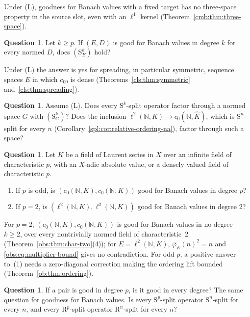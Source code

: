 \documentclass[11pt]{amsart}
\theoremstyle{definition}
\theoremstyle{remark}
\numberwithin{equation}{section}
\newcommand{\N}{\mathbb N}
\newcommand{\Kh}{\widehat K}
\theoremstyle{plain}
\theoremstyle{definition}
\newtheorem{question}[theorem]{Question}
\theoremstyle{plain}
\begin{document}
Under \textup{(L)}, goodness for Banach values with a fixed target has no three-space property in the source slot, even
with an $\ell^1$ kernel (Theorem~\ref{cmb:thm:three-space}).

\begin{question}\label{q:quest:source-split}
Let $k\ge p$. If $(E,D)$ is good for Banach values in degree $k$ for every normed $D$, does $(\mathrm S^k_E)$ hold?
\end{question}

Under \textup{(L)} the answer is yes for spreading, in particular symmetric, sequence spaces $E$ in which $c_{00}$ is
dense (Theorems~\ref{cls:thm:symmetric} and~\ref{cls:thm:spreading}).

\begin{question}\label{q:quest:factorization}
Assume \textup{(L)}. Does every $\mathrm S^k$-split operator factor through a normed space $G$ with $(\mathrm S^k_G)$? Does
the inclusion $\ell^2(\N,K)\to c_0(\N,\Kh)$, which is $\mathrm S^n$-split for every $n$
(Corollary~\ref{spl:cor:relative-ordering-na}), factor through such a space?
\end{question}

\begin{question}\label{q:quest:residue}
Let $K$ be a field of Laurent series in $X$ over an infinite field of characteristic $p$, with an $X$-adic absolute
value, or a densely valued field of characteristic $p$.
\begin{enumerate}
\item If $p$ is odd, is $(c_0(\N,K),c_0(\N,K))$ good for Banach values in degree $p$?
\item If $p=2$, is $(\ell^2(\N,K),\ell^2(\N,K))$ good for Banach values in degree $2$?
\end{enumerate}
\end{question}

For $p=2$, $(c_0(\N,K),c_0(\N,K))$ is good for Banach values in no degree $k\ge2$, over every nontrivially normed field
of characteristic~$2$ (Theorem~\ref{obs:thm:char-two}(4)); for $E=\ell^2(\N,K)$, $\bar\varphi_E(n)^2=n$ and
\eqref{obs:eq:multiplier-bound} gives no contradiction. For odd $p$, a positive answer to~(1) needs a zero-diagonal
correction making the ordering lift bounded (Theorem~\ref{ob:thm:ordering}).

\begin{question}\label{q:quest:height}
If a pair is good in degree $p$, is it good in every degree? The same question for goodness for Banach values. Is every
$\mathrm S^p$-split operator $\mathrm S^n$-split for every $n$, and every $\mathrm R^p$-split operator
$\mathrm R^n$-split for every $n$?
\end{question}
\end{document}
